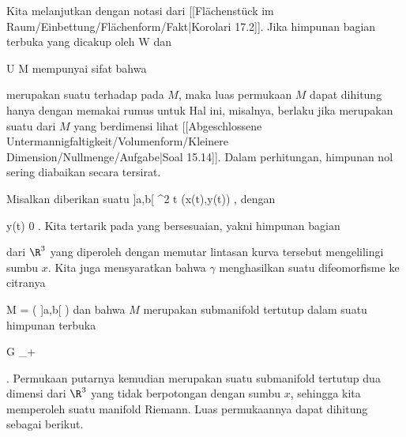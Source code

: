 {}
{

Kita melanjutkan dengan notasi dari
[[Flächenstück im Raum/Einbettung/Flächenform/Fakt|Korolari 17.2]].
Jika himpunan bagian terbuka yang dicakup oleh
\mathkor {} {W} {dan} {\varphi} {}

\mavergleichskette
{\vergleichskette
{ U
}
{ \subseteq }{ M
}
{  }{
}
{    }{
}
{   }{
}
}
{}{}{}
mempunyai sifat bahwa

 merupakan suatu
terhadap
pada $M$, maka luas permukaan $M$ dapat dihitung hanya dengan memakai rumus untuk
 Hal ini, misalnya, berlaku jika
 merupakan suatu
dari $M$ yang berdimensi
 lihat
[[Abgeschlossene Untermannigfaltigkeit/Volumenform/Kleinere Dimension/Nullmenge/Aufgabe|Soal 15.14]].
Dalam perhitungan, himpunan nol sering diabaikan secara tersirat.

}


Misalkan diberikan suatu
\maabbeledisp {\gamma} {]a,b[} {\R^2
} {t} {(x(t),y(t))
} {,}
dengan

\mavergleichskette
{\vergleichskette
{ y(t)
}
{ \geq }{ 0
}
{  }{
}
{    }{
}
{   }{
}
}
{}{}{.}
Kita tertarik pada
yang bersesuaian, yakni himpunan bagian

\mathdisp {\left\{  (x(t), y(t) \cos \alpha , y(t) \sin \alpha)   \mid   t \in ]a,b[  , \,  \alpha \in [0,2\pi]       \right\}} {  }

dari $\R^3$ yang diperoleh dengan memutar lintasan kurva tersebut mengelilingi sumbu $x$. Kita juga mensyaratkan bahwa $\gamma$ menghasilkan suatu difeomorfisme ke citranya

\mavergleichskette
{\vergleichskette
{ M
}
{ = }{ \gamma \left(  ]a,b[  \right)
}
{  }{
}
{    }{
}
{   }{
}
}
{}{}{}
dan bahwa $M$ merupakan submanifold tertutup dalam suatu himpunan terbuka

\mavergleichskettedisp
{\vergleichskette
{ G
}
{ \subseteq} {\R \times \R_+
}
{ } {
}
{ } {
}
{ } {
}
}
{}{}{}

 {} {.}
Permukaan putarnya kemudian merupakan suatu submanifold tertutup dua dimensi dari $\R^3$ yang tidak berpotongan dengan sumbu $x$, sehingga kita memperoleh suatu manifold Riemann. Luas permukaannya dapat dihitung sebagai berikut.

